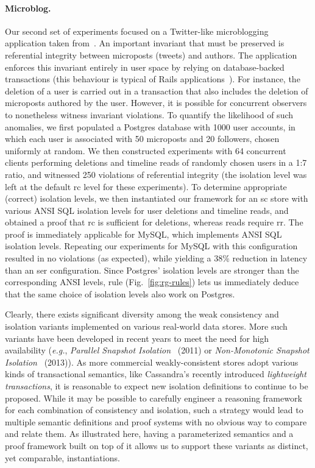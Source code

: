 \paragraph{Microblog.} Our second set of experiments focused on a
Twitter-like microblogging application taken from~\cite{railsbook}.
An important invariant that must be preserved is referential integrity
between microposts (tweets) and authors. The application enforces this
invariant entirely in user space by relying on database-backed
transactions (this behaviour is typical of Rails
applications~\cite{bailisferal}).  For instance, the deletion of a
user is carried out in a transaction that also includes the deletion
of microposts authored by the user.  However, it is possible for
concurrent observers to nonetheless witness invariant violations. To
quantify the likelihood of such anomalies, we first populated a
Postgres database with 1000 user accounts, in which each user is
associated with 50 microposts and 20 followers, chosen uniformly at
random. We then constructed experiments with 64 concurrent clients
performing deletions and timeline reads of randomly chosen users in a
1:7 ratio, and witnessed 250 violations of referential integrity (the
isolation level was left at the default {\sc rc} level for these
experiments). To determine appropriate (correct) isolation levels, we
then instantiated our framework for an {\sc sc} store with various
ANSI SQL isolation levels for user deletions and timeline reads, and
obtained a proof that {\sc rc} is sufficient for deletions, whereas
reads require {\sc rr}. The proof is immediately applicable for MySQL,
which implements ANSI SQL isolation levels. Repeating our experiments
for MySQL with this configuration resulted in no violations (as
expected), while yielding a 38\% reduction in latency than an {\sc
  ser} configuration.  Since Postgres' isolation levels are stronger
than the corresponding ANSI levels,  rule
(Fig.~\ref{fig:rg-rules}) lets us immediately deduce that the same
choice of isolation levels also work on Postgres.

Clearly, there exists significant diversity among the weak consistency
and isolation variants implemented on various real-world data
stores. More such variants have been developed in recent years to meet
the need for high availability (\emph{e.g.}, \emph{Parallel Snapshot
  Isolation}~\cite{psi} (2011) or \emph{Non-Monotonic Snapshot
  Isolation}~\cite{nmsi} (2013)).  As more commercial
weakly-consistent stores adopt various kinds of transactional
semantics, like Cassandra's recently introduced \emph{lightweight
  transactions}, it is reasonable to expect new isolation definitions
to continue to be proposed.  While it may be possible to carefully
engineer a reasoning framework for each combination of consistency and
isolation, such a strategy would lead to multiple semantic definitions
and proof systems with no obvious way to compare and relate them. As
illustrated here, having a parameterized semantics and a proof
framework built on top of it allows us to support these variants as
distinct, yet comparable, instantiations.

